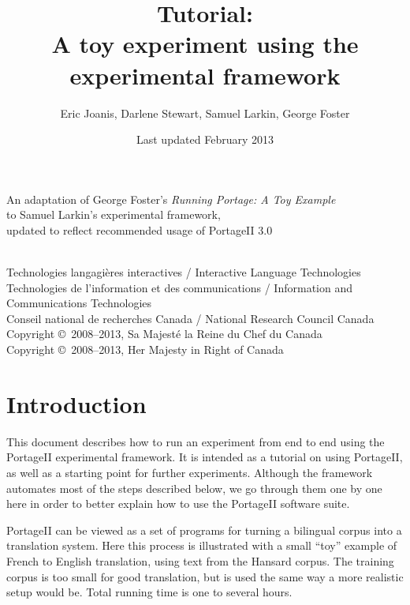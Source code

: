 \documentclass[11pt,letterpaper]{article}
\title{\PS Tutorial: \\
       A toy experiment using the \\
       experimental framework}
\date{Last updated February 2013}
\author{Eric Joanis, Darlene Stewart, Samuel Larkin, George Foster}
\newcommand{\PS}{PortageII\xspace}
\begin{document}
\vfill

\maketitle

\vfill

\begin{center}
An adaptation of George Foster's \emph{Running Portage: A Toy Example} \\
to Samuel Larkin's experimental framework,\\
updated to reflect recommended usage of PortageII 3.0
\end{center}

\vfill
\vfill

\begin{center}
{~} \\ \footnotesize
   Technologies langagières interactives /
      Interactive Language Technologies \\
   Technologies de l'information et des communications /
      Information and Communications Technologies \\
   Conseil national de recherches Canada /
      National Research Council Canada \\
   Copyright \copyright\ 2008--2013, Sa Majesté la Reine du Chef du Canada
   \\ Copyright \copyright\ 2008--2013, Her Majesty in Right of Canada
\end{center}

\vfill

\newpage


\tableofcontents


\newpage


\section{Introduction}

This document describes how to run an experiment from end to end using the \PS
experimental framework. It is intended as a tutorial on using \PS, as well as a
starting point for further experiments.  Although the framework automates most
of the steps described below, we go through them one by one here in order to
better explain how to use the \PS software suite.

\PS can be viewed as a set of programs for turning a bilingual corpus into a
translation system. Here this process is illustrated with a small ``toy''
example of French to English translation, using text from the Hansard corpus.
The training corpus is too small for good translation, but is used the same way
a more realistic setup would be. Total running time is one to several hours.
\end{document}
